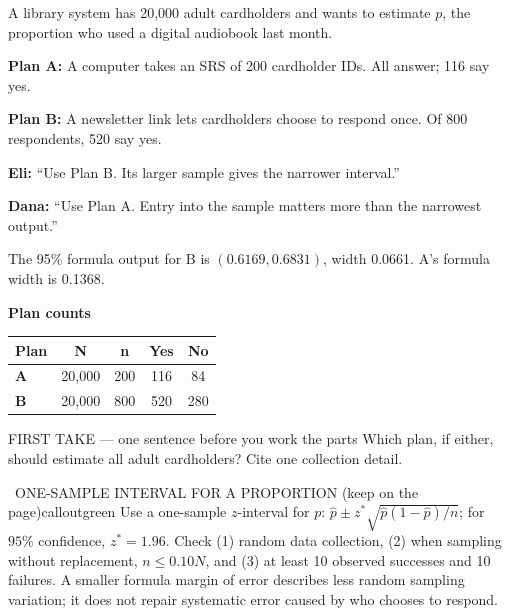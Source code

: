 \documentclass[11pt]{article}
\begin{document}


A library system has 20,000 adult cardholders and wants to estimate $p$, the proportion who used a digital audiobook last month.\par\smallskip \textbf{Plan A:} A computer takes an SRS of 200 cardholder IDs. All answer; 116 say yes.\par \textbf{Plan B:} A newsletter link lets cardholders choose to respond once. Of 800 respondents, 520 say yes.\par\smallskip \textbf{Eli:} ``Use Plan B. Its larger sample gives the narrower interval.''\par \textbf{Dana:} ``Use Plan A. Entry into the sample matters more than the narrowest output.''\par\smallskip The 95\% formula output for B is $(0.6169,0.6831)$, width 0.0661. A's formula width is 0.1368.\par
\begin{center}
\textbf{Plan counts}\par\smallskip
\begin{tabular}{|l|c|c|c|c|}
\hline
\textbf{Plan} & \textbf{N} & \textbf{n} & \textbf{Yes} & \textbf{No} \\ \hline
\textbf{A} & 20,000 & 200 & 116 & 84 \\ \hline
\textbf{B} & 20,000 & 800 & 520 & 280 \\ \hline
\end{tabular}
\end{center}
\begin{firsttakebox}{FIRST TAKE --- one sentence before you work the parts}
Which plan, if either, should estimate all adult cardholders? Cite one collection detail.
\workspace{0.9in}
\end{firsttakebox}

\begin{callout}{\IconBook\ ONE-SAMPLE INTERVAL FOR A PROPORTION (keep on the page)}{calloutgreen}
Use a one-sample $z$-interval for $p$: $\hat p\pm z^*\sqrt{\hat p(1-\hat p)/n}$;
for $95\%$ confidence, $z^*=1.96$. Check (1) random data collection, (2) when sampling
without replacement, $n\le 0.10N$, and (3) at least 10 observed successes and 10 failures.
A smaller formula margin of error describes less random sampling variation; it does not repair
systematic error caused by who chooses to respond.
\end{callout}
\end{document}
